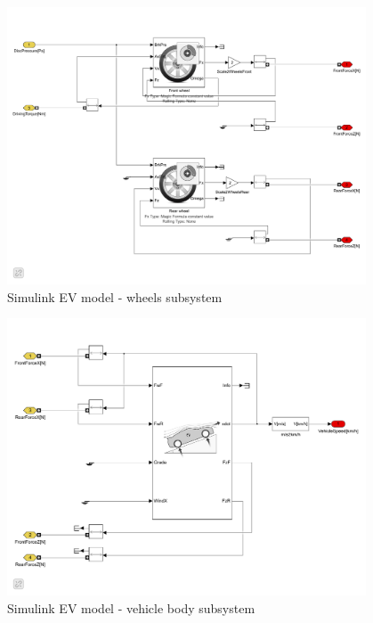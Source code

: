 \newpage

\begin{figure}[H]
    \centering
    \includegraphics[width=0.95\textwidth]{images/simulink_wheels.pdf}
    \caption{Simulink EV model - wheels subsystem}
    \label{fig:simulink_wheels}
\end{figure}

\begin{figure}[H]
    \centering
    \includegraphics[width=0.95\textwidth]{images/simulink_body.pdf}
    \caption{Simulink EV model - vehicle body subsystem}
    \label{fig:simulink_body}
\end{figure}







